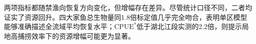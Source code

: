 两项指标都随禁渔向恢复方向变化，但增幅存在差异。尽管统计口径不同，二者均证实了资源回升。四大家鱼总生物量同1.8倍标定值几乎完全吻合，表明单区模型能够准确描述全流域平均恢复水平；$\mathrm{CPUE}^*$低于湖北江段实测的2.2倍，则提示局地高捕捞效率下的资源增幅可能更为显著。

